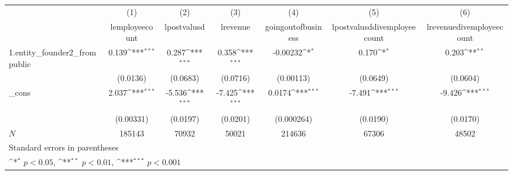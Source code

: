{
\def\sym#1{\ifmmode^{#1}\else\(^{#1}\)\fi}
\begin{tabular}{l*{6}{c}}
\hline\hline
            &\multicolumn{1}{c}{(1)}&\multicolumn{1}{c}{(2)}&\multicolumn{1}{c}{(3)}&\multicolumn{1}{c}{(4)}&\multicolumn{1}{c}{(5)}&\multicolumn{1}{c}{(6)}\\
            &\multicolumn{1}{c}{lemployeecount}&\multicolumn{1}{c}{lpostvalusd}&\multicolumn{1}{c}{lrevenue}&\multicolumn{1}{c}{goingoutofbusiness}&\multicolumn{1}{c}{lpostvalusddivemployeecount}&\multicolumn{1}{c}{lrevenuedivemployeecount}\\
\hline
1.entity\_founder2\_frompublic&       0.139\sym{***}&       0.287\sym{***}&       0.358\sym{***}&    -0.00232\sym{*}  &       0.170\sym{*}  &       0.203\sym{**} \\
            &    (0.0136)         &    (0.0683)         &    (0.0716)         &   (0.00113)         &    (0.0649)         &    (0.0604)         \\
[1em]
\_cons      &       2.037\sym{***}&      -5.536\sym{***}&      -7.425\sym{***}&      0.0174\sym{***}&      -7.491\sym{***}&      -9.426\sym{***}\\
            &   (0.00331)         &    (0.0197)         &    (0.0201)         &  (0.000264)         &    (0.0190)         &    (0.0170)         \\
\hline
\(N\)       &      185143         &       70932         &       50021         &      214636         &       67306         &       48502         \\
\hline\hline
\multicolumn{7}{l}{\footnotesize Standard errors in parentheses}\\
\multicolumn{7}{l}{\footnotesize \sym{*} \(p<0.05\), \sym{**} \(p<0.01\), \sym{***} \(p<0.001\)}\\
\end{tabular}
}
